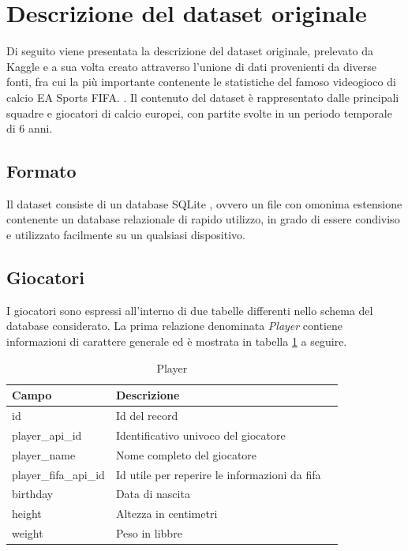 \documentclass[hidelinks, 12pt]{article}
\begin{document}
\clearpage



\section{Descrizione del dataset originale}

Di seguito viene presentata la descrizione del dataset originale, prelevato da Kaggle \cite{site:kaggle-dataset} e a sua volta creato attraverso l'unione di dati provenienti da diverse fonti, fra cui la più importante contenente le statistiche del famoso videogioco di calcio EA Sports FIFA. \cite{site:ea-fifa}. Il contenuto del dataset è rappresentato dalle principali squadre e giocatori di calcio europei, con partite svolte in un periodo temporale di 6 anni.



\subsection{Formato}

Il dataset consiste di un database SQLite \cite{site:sqlite}, ovvero un file con omonima estensione contenente un database relazionale di rapido utilizzo, in grado di essere condiviso e utilizzato facilmente su un qualsiasi dispositivo.



\subsection{Giocatori}

I giocatori sono espressi all'interno di due tabelle differenti nello schema del database considerato. La prima relazione denominata {\it Player} contiene informazioni di carattere generale ed è mostrata in tabella \ref{tab:player} a seguire.

\begin{table}[H]
	\caption{Player}\label{tab:player}
	\centering
	\begin{tabular}{|l|l|l|}
		\hline
		Campo & Descrizione \\
		\hline
		id & Id del record \\
		player\_api\_id & Identificativo univoco del giocatore \\
		player\_name & Nome completo del giocatore \\
		player\_fifa\_api\_id & Id utile per reperire le informazioni da fifa \\
		birthday & Data di nascita \\
		height & Altezza in centimetri \\
		weight & Peso in libbre \\
		\hline
	\end{tabular}
\end{table}
\end{document}

